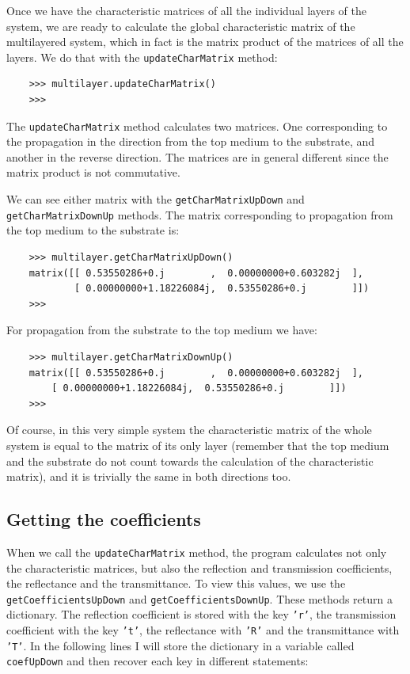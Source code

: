 \documentclass[a4paper,11pt,aps,final]{revtex4}
\begin{document}
Once we have the characteristic matrices of all the individual layers of the system, we are ready to calculate the global characteristic matrix of the multilayered system, which in fact is the matrix product of the matrices of all the layers. We do that with the \texttt{updateCharMatrix} method:

\begin{verbatim}
    >>> multilayer.updateCharMatrix()
    >>>
\end{verbatim}

The \texttt{updateCharMatrix} method calculates two matrices. One corresponding to the propagation in the direction from the top medium to the substrate, and another in the reverse direction. The matrices are in general different since the matrix product is not commutative.

We can see either matrix with the \texttt{getCharMatrixUpDown} and \texttt{getCharMatrixDownUp} methods. The matrix corresponding to propagation from the top medium to the substrate is:

\begin{verbatim}
    >>> multilayer.getCharMatrixUpDown()
    matrix([[ 0.53550286+0.j        ,  0.00000000+0.603282j  ],
            [ 0.00000000+1.18226084j,  0.53550286+0.j        ]])
    >>>
\end{verbatim}

For propagation from the substrate to the top medium we have:

\begin{verbatim}
    >>> multilayer.getCharMatrixDownUp()
    matrix([[ 0.53550286+0.j        ,  0.00000000+0.603282j  ],
        [ 0.00000000+1.18226084j,  0.53550286+0.j        ]])
    >>>
\end{verbatim}

Of course, in this very simple system the characteristic matrix of the whole system is equal to the matrix of its only layer (remember that the top medium and the substrate do not count towards the calculation of the characteristic matrix), and it is trivially the same in both directions too.

\subsection{Getting the coefficients}

When we call the \texttt{updateCharMatrix} method, the program calculates not only the characteristic matrices, but also the reflection and transmission coefficients, the reflectance and the transmittance. To view this values, we use the \texttt{getCoefficientsUpDown} and \texttt{getCoefficientsDownUp}. These methods return a dictionary. The reflection coefficient is stored with the key \texttt{'r'}, the transmission coefficient with the key \texttt{'t'}, the reflectance with \texttt{'R'} and the transmittance with \texttt{'T'}. In the following lines I will store the dictionary in a variable called \texttt{coefUpDown} and then recover each key in different statements:
\end{document}
